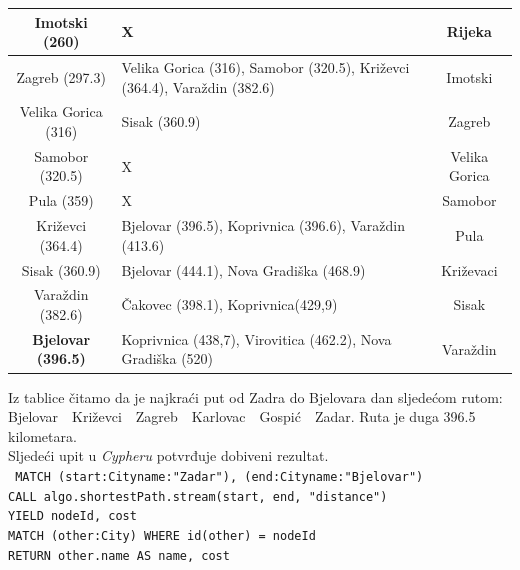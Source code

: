 \documentclass[10pt]{scrartcl}
\begin{document}
\begin{center}
\begin{table}[H]
\begin{tabularx}{1\textwidth}{c X c}
Imotski (260)                                    & X                                                                                   & Rijeka                      \\ \hline
Zagreb (297.3)                                   & Velika Gorica (316), Samobor (320.5), Križevci (364.4), Varaždin (382.6)            & Imotski                     \\ \hline
Velika Gorica (316)                              & Sisak (360.9)                                                                       & Zagreb                      \\ \hline
Samobor (320.5)                                  & X                                                                                   & Velika Gorica               \\ \hline
Pula (359)                                       & X                                                                                   & Samobor                     \\ \hline
Križevci (364.4)                                 & Bjelovar (396.5), Koprivnica (396.6), {\color[HTML]{9B9B9B} Varaždin (413.6)}       & Pula                        \\ \hline
Sisak (360.9)                                    & {\color[HTML]{9B9B9B} Bjelovar (444.1)}, Nova Gradiška (468.9)                      & Križevaci                   \\ \hline
Varaždin (382.6)                                 & Čakovec (398.1), {\color[HTML]{9B9B9B} Koprivnica(429,9)}                           & Sisak                       \\ \hline
{\textbf{Bjelovar (396.5)}} & {\color[HTML]{9B9B9B} Koprivnica (438,7), Virovitica (462.2),  Nova Gradiška (520)} & Varaždin  
\end{tabularx}
\end{table}
\end{center}

Iz tablice čitamo da je najkraći put od Zadra do Bjelovara dan sljedećom rutom:
Bjelovar~\textleftarrow~Križevci~\textleftarrow~Zagreb~\textleftarrow~Karlovac~\textleftarrow~Gospić~\textleftarrow~Zadar. 
Ruta je duga 396.5 kilometara. \\

Sljedeći upit u \emph{Cypheru} potvrđuje dobiveni rezultat. \\
\newline
\texttt{
MATCH (start:City{name:"Zadar"}), (end:City{name:"Bjelovar"}) \\
CALL algo.shortestPath.stream(start, end, "distance") \\
YIELD nodeId, cost \\
MATCH (other:City) WHERE id(other) = nodeId \\
RETURN other.name AS name, cost
}
\end{document}
